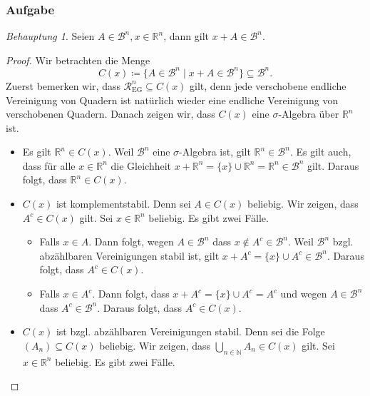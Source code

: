 \documentclass[draft,a5paper]{article}
\theoremstyle{remark}
\newtheorem*{Behauptung}{Behauptung}
\begin{document}
\subsubsection{Aufgabe}
\begin{Behauptung}
  Seien \(A \in \mathcal{B}^{n}, x \in \mathbb{R}^{n}\), dann gilt \(x + A \in \mathcal{B}^{n}\).
\end{Behauptung}
\begin{proof}
  Wir betrachten die Menge
  \[ C(x) \coloneq \{A \in \mathcal{B}^{n} \mid x + A \in \mathcal{B}^{n}\} \subseteq \mathcal{B}^{n}.\]
  Zuerst bemerken wir, dass
  \(\mathcal{R}_{\text{EG}}^{n} \subseteq C(x)\) gilt, denn jede verschobene endliche
  Vereinigung von Quadern ist natürlich wieder eine endliche
  Vereinigung von verschobenen Quadern.
  Danach zeigen wir, dass \(C(x)\) eine \(\sigma\)-Algebra über \(\mathbb{R}^{n}\) ist.
  \begin{itemize}
  \item Es gilt \(\mathbb{R}^{n} \in C(x)\).  Weil \(\mathcal{B}^{n}\) eine
    \(\sigma\)-Algebra ist, gilt
    \(\mathbb{R}^{n} \in \mathcal{B}^{n}\).  Es gilt auch, dass für alle
    \(x \in \mathbb{R}^{n}\) die Gleichheit
    \(x + \mathbb{R}^{n} = \{x\} \cup \mathbb{R}^{n} = \mathbb{R}^{n} \in \mathcal{B}^{n}\) gilt.  Daraus folgt,
    dass \(\mathbb{R}^{n} \in C(x)\).
  \item \(C(x)\) ist komplementstabil.  Denn sei \(A \in C(x)\) beliebig.  Wir
    zeigen, dass \(A^{c} \in C(x)\) gilt.  Sei \(x \in \mathbb{R}^{n}\) beliebig.  Es gibt
    zwei Fälle.
    \begin{itemize}
    \item Falls \(x \in A\).  Dann folgt, wegen \(A \in \mathcal{B}^{n}\) dass \(x \notin
      A^{c} \in \mathcal{B}^{n}\).  Weil \(\mathcal{B}^{n}\) bzgl. abzählbaren Vereinigungen
      stabil ist, gilt \(x + A^{c} = \{x\} \cup A^{c} \in \mathcal{B}^{n} \).  Daraus
      folgt, dass  \(A^{c} \in C(x)\).
    \item Falls \(x \in A^{c}\).  Dann folgt, dass \(x + A^{c} = \{x\} \cup
      A^{c} = A^{c}\) und wegen \(A \in \mathcal{B}^{n}\) dass \(A^{c} \in \mathcal{B}^{n}\).
      Daraus folgt, dass \(A^{c} \in C(x)\).
    \end{itemize}
  \item \(C(x)\) ist bzgl. abzählbaren Vereinigungen stabil.  Denn sei
    die Folge \((A_{n}) \subseteq C(x)\) beliebig.  Wir zeigen, dass
    \(\bigcup_{n\in\mathbb{N}}{A_{n}}\in C(x)\) gilt. Sei
    \(x \in \mathbb{R}^{n}\) beliebig.  Es gibt zwei Fälle.

\end{itemize}
\end{proof}
\end{document}
